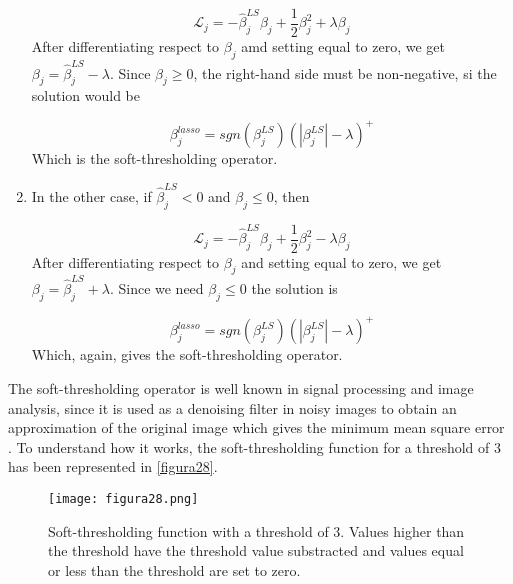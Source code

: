 \begin{enumerate}
    \begin{equation}
        \mathcal{L}_j = -\hat{\beta}^{LS}_j\beta_j+\frac{1}{2}\beta^2_j+\lambda\beta_j
    \end{equation}
    After differentiating respect to $\beta_j$ amd setting equal to zero, we get $\beta_j = \hat{\beta}^{LS}_j-\lambda$. Since $\beta_j \geq 0$, the right-hand side must be non-negative, si the solution would be
    
    \begin{equation}
        \beta_j^{lasso}=sgn(\beta_j^{LS})(|\beta_j^{LS}|-\lambda)^+
    \end{equation}
    Which is the soft-thresholding operator.
    \item In the other case, if $\hat{\beta}^{LS}_j < 0$ and $\beta_j \leq 0$, then
    
    \begin{equation}
        \mathcal{L}_j = -\hat{\beta}^{LS}_j\beta_j+\frac{1}{2}\beta^2_j-\lambda\beta_j
    \end{equation}
    After differentiating respect to $\beta_j$ and setting equal to zero, we get $\beta_j = \hat{\beta}^{LS}_j+\lambda$. Since we need $\beta_j \leq 0$ the solution is
    
    \begin{equation}
        \beta_j^{lasso}=sgn(\beta_j^{LS})(|\beta_j^{LS}|-\lambda)^+
    \end{equation}
    Which, again, gives the soft-thresholding operator.
\end{enumerate}

\vspace{20pt}
The soft-thresholding operator is well known in signal processing and image analysis, since it is used as a denoising filter in noisy images to obtain an approximation of the original image which gives the minimum mean square error \parencite{khare2005soft, joy2013denoising}. To understand how it works, the soft-thresholding function for a threshold of 3 has been represented in \autoref{figura28}.

\begin{figure}[hbtp]
\centering
\texttt{[image: figura28.png]}
\caption{Soft-thresholding function with a threshold of 3. Values higher than the threshold have the threshold value substracted and values equal or less than the threshold are set to zero.}
\label{figura28}
\end{figure}

